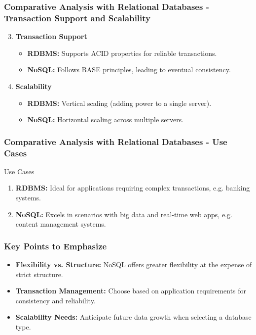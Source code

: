 \documentclass[aspectratio=169]{beamer}
\begin{document}
\begin{frame}[fragile]
    \frametitle{Comparative Analysis with Relational Databases - Transaction Support and Scalability}
    \begin{enumerate}
        \setcounter{enumi}{2}
        \item \textbf{Transaction Support}
            \begin{itemize}
                \item \textbf{RDBMS:} Supports ACID properties for reliable transactions.
                \item \textbf{NoSQL:} Follows BASE principles, leading to eventual consistency.
            \end{itemize}
        \item \textbf{Scalability}
            \begin{itemize}
                \item \textbf{RDBMS:} Vertical scaling (adding power to a single server).
                \item \textbf{NoSQL:} Horizontal scaling across multiple servers.
            \end{itemize}
    \end{enumerate}
\end{frame}

\begin{frame}[fragile]
    \frametitle{Comparative Analysis with Relational Databases - Use Cases}
    \begin{block}{Use Cases}
        \begin{enumerate}
            \item \textbf{RDBMS:} Ideal for applications requiring complex transactions, e.g. banking systems.
            \item \textbf{NoSQL:} Excels in scenarios with big data and real-time web apps, e.g. content management systems.
        \end{enumerate}
    \end{block}
\end{frame}

\begin{frame}[fragile]
    \frametitle{Key Points to Emphasize}
    \begin{itemize}
        \item \textbf{Flexibility vs. Structure:} NoSQL offers greater flexibility at the expense of strict structure.
        \item \textbf{Transaction Management:} Choose based on application requirements for consistency and reliability.
        \item \textbf{Scalability Needs:} Anticipate future data growth when selecting a database type.
    \end{itemize}
\end{frame}
\end{document}
